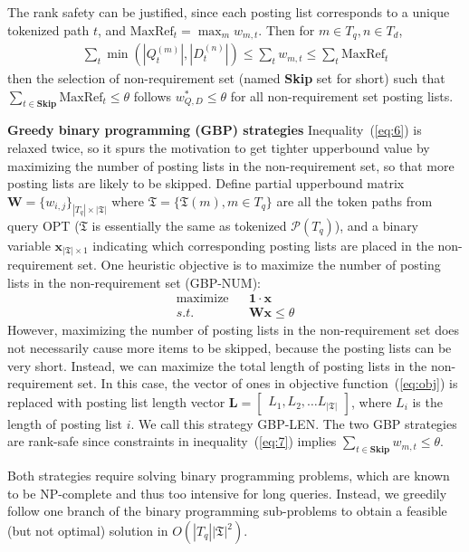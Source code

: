 \documentclass[runningheads]{llncs}
\begin{document}
The rank safety can be justified, since each posting list corresponds to a unique tokenized path $t$, and $\text{MaxRef}_t = \max_m w_{m, t}$. Then for $m \in T_q, n \in T_d$,
\begin{align}
\label{eq:6}
\sum_t \min(|Q^{(m)}_t|, |D^{(n)}_t|) \le \sum_t w_{m,t} \le \sum_t \text{MaxRef}_t
\end{align}
then the selection of non-requirement set (named \textbf{Skip} set for short) such that 
$\sum_{t \in \textbf{Skip}} \text{MaxRef}_t \le \theta$
follows $w^*_{Q, D} \le \theta$ for all non-requirement set posting lists.

\vspace{0.1in}
\noindent \textbf{Greedy binary programming (GBP) strategies}\;
%
Inequality~(\ref{eq:6}) is relaxed twice, so it spurs the motivation to get tighter upperbound value by maximizing the number of posting lists in the non-requirement set, so that more posting lists are likely to be skipped.
Define partial upperbound matrix $\mathbf{W} = \{ w_{i, j} \}_{|T_q| \times |\mathfrak{T}|} $ where $\mathfrak{T} = \{ \mathfrak{T}(m), m \in T_q \}$ are all the token paths from query OPT ($\mathfrak{T}$ is essentially the same as tokenized $\mathcal{P}(T_q)$), and a binary variable $\boldsymbol{x}_{|\mathfrak{T}| \times 1}$ indicating which corresponding posting lists are placed in the non-requirement set.
One heuristic objective is to maximize the number of posting lists in the non-requirement set (GBP-NUM):
\begin{align}
\label{eq:obj}
\text{maximize} && \mathbf{1} \cdot \boldsymbol{x} \\
\label{eq:7}
s.t.            && \mathbf{W} \boldsymbol{x} \le \theta
\end{align}
However, maximizing the number of posting lists in the non-requirement set does not necessarily cause more items to be skipped, because the posting lists can be very short.
Instead, we can maximize the total length of posting lists in the non-requirement set. In this case, the vector of ones in objective function~(\ref{eq:obj}) is replaced with posting list length vector
$\mathbf{L} = \begin{bmatrix} L_1, L_2, \ldots L_{|\mathfrak{T}|}\end{bmatrix}$, where $L_i$ is the length of posting list $i$.
We call this strategy GBP-LEN.
%
The two GBP strategies are rank-safe 
since constraints in inequality~(\ref{eq:7}) implies $\sum_{t \in \textbf{Skip}} w_{m,t} \le \theta$.

Both strategies require solving binary programming problems, which are known to be NP-complete and thus too intensive for long queries.
Instead, we greedily follow one branch of the binary programming sub-problems to obtain a feasible (but not optimal) solution in $O(|T_q| |\mathfrak{T}|^2)$.
\end{document}
